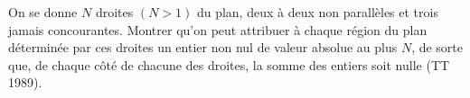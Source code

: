 On se donne $N$ droites $(N > 1)$ du plan, deux à deux non parallèles et trois jamais concourantes. Montrer qu'on peut attribuer à chaque région du plan déterminée par ces droites un entier non nul de valeur absolue au plus $N$, de sorte que, de chaque côté de chacune des droites, la somme des entiers soit nulle (TT 1989).
